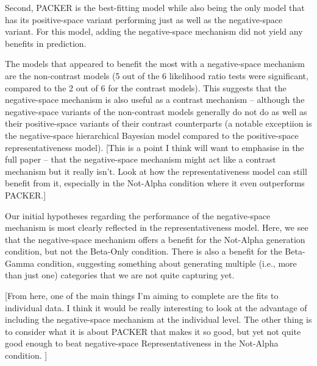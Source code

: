 \documentclass[12pt]{article}
\begin{document}
\begin{flushleft}
Second, PACKER is the best-fitting model while also being the only model that has its positive-space variant performing
just as well as the negative-space variant. For this model, adding the negative-space mechanism did not yield any
benefits in prediction.

The models that appeared to benefit the most with a negative-space mechanism are the non-contrast models (5 out of
the 6 likelihood ratio tests were significant, compared to the 2 out of 6 for the contrast models). This suggests that
the negative-space mechanism is also useful as a contrast mechanism -- although the negative-space variants of the
non-contrast models generally do not do as well as their positive-space variants of their contrast counterparts (a
notable exceptiion is the negative-space hierarchical Bayesian model compared to the positive-space representativeness
model). [This is a point I think will want to emphasise in the full paper -- that the negative-space mechanism might act
like a contrast mechanism but it really isn't. Look at how the representativeness model can still benefit from it, especially
in the Not-Alpha condition where it even outperforms PACKER.]

Our initial hypotheses regarding the performance of the negative-space mechanism is most clearly reflected in the
representativeness model. Here, we see that the negative-space mechanism offers a benefit for the Not-Alpha generation
condition, but not the Beta-Only condition. There is also a benefit for the Beta-Gamma condition, suggesting something
about generating multiple (i.e., more than just one) categories that we are not quite capturing yet.

[From here, one of the main things I'm aiming to complete are the fits to individual data. I think it would be really
interesting to look at the advantage of including the negative-space mechanism at the individual level. The other thing
is to consider what it is about PACKER that makes it so good, but yet not quite good enough to beat negative-space
Representativeness in the Not-Alpha condition. ]

\end{flushleft}
\clearpage  
\end{document}
